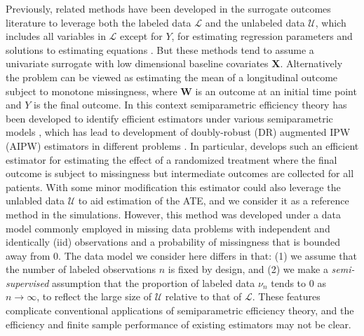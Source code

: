 \documentclass[useAMS,referee,usenatbib]{biom}
\def\bX{\mathbf{X}}
\def\bW{\mathbf{W}}
\def\Lscr{\mathscr{L}}
\def\Uscr{\mathscr{U}}
\begin{document}
Previously, related methods have been developed in the surrogate outcomes literature to leverage both the labeled
data $\Lscr$ and the unlabeled data $\Uscr$, which includes all variables in $\Lscr$ except for $Y$, for estimating 
regression parameters 
\citep{pepe1992inference} 
and solutions 
to estimating equations \citep{chen2003information}. But these methods tend to assume a univariate 
surrogate with low dimensional baseline covariates $\bX$. 
Alternatively the problem can be viewed as estimating the mean of a longitudinal outcome subject to monotone missingness, where
$\bW$ is an outcome at an initial time point and $Y$ is the final outcome. In this context semiparametric efficiency 
theory has been developed to identify efficient estimators under various semiparametric models \citep{robins1994estimation,rotnitzky1998semiparametric},
which has lead to development of doubly-robust (DR) augmented IPW (AIPW) estimators  in different problems 
\citep{davidian2005semiparametric,williamson2012doubly,zhang2016causal}. In particular, \cite{davidian2005semiparametric}
develops such an efficient estimator for estimating the effect of a randomized treatment where the final outcome is subject to missingness
but intermediate outcomes are collected for all patients. With some minor modification this estimator could also leverage 
the unlabled data $\Uscr$ to aid estimation of the ATE, and we consider it as a reference method in the simulations.  
However, this method was developed under a data model commonly employed in missing data problems with independent and identically 
(iid) observations and a probability of missingness that is bounded away from $0$.
The data model we consider here differs in that:
(1) we assume that the number of labeled observations $n$ is fixed by design, and (2) 
we make a \emph{semi-supervised} assumption that the proportion of labeled data $\nu_n$ tends to $0$ as $n\to\infty$, to 
reflect the large size of $\Uscr$ relative to that of $\Lscr$. These features complicate conventional applications of
semiparametric efficiency theory, and the efficiency and finite sample performance of existing estimators may not be clear.
\end{document}
